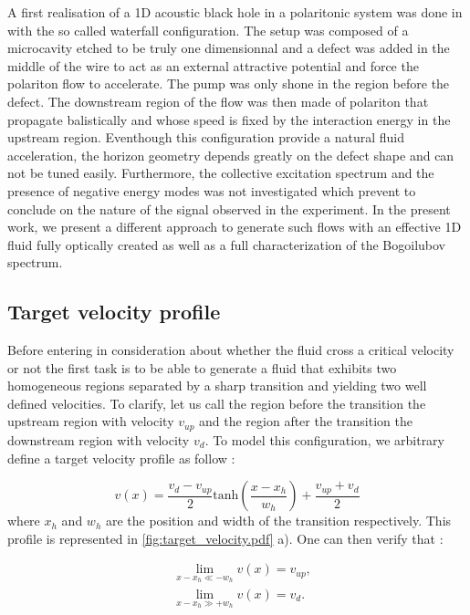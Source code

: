 A first realisation of a 1D acoustic black hole in a polaritonic system was done in \cite{nguyen_acoustic_2015} with the so called waterfall configuration. 
The setup was composed of a microcavity etched to be truly one dimensionnal and a defect was added in the middle of the wire to act as an external attractive potential and force the polariton flow to accelerate. The pump was only shone in the region before the defect. The downstream region of the flow was then made of polariton that propagate balistically and whose speed is fixed by the interaction energy
in the upstream region.
Eventhough this configuration provide a natural fluid acceleration, the horizon geometry depends greatly on the defect shape and can not be tuned easily.  Furthermore, the collective excitation spectrum and the presence of negative energy modes was not investigated which 
prevent to conclude on the nature of the signal observed in the experiment. In the present work, we present a different approach to generate such flows with an effective 1D fluid fully optically created as well as a full characterization of the Bogoilubov spectrum.

\subsection{Target velocity profile}
Before entering in consideration about whether the fluid cross a critical velocity or not the first task is to be able to generate a fluid that exhibits two homogeneous regions separated by a sharp transition and yielding two well defined velocities. 
To clarify, let us call the region before the transition the upstream region with velocity $v_{up}$ and the region after the transition the downstream region with velocity $v_d$.
To model this configuration, we arbitrary define a target velocity profile as follow : 

\begin{equation}
    v(x)= \frac{v_{d}-v_{up}}{2}\mathrm{tanh}(\frac{x-x_h}{w_h})+\frac{v_{up}+v_{d}}{2}
    \label{eq:target_velocity}
\end{equation}
where $x_h$ and $w_h$ are the position and width of the transition respectively. This profile is represented in \autoref{fig:target_velocity.pdf} a).
One can then verify that :

\begin{subequations}
    \begin{align}
    &\lim\limits_{x-x_h\ll-w_h} v(x) = v_{up},\\
    &\lim\limits_{x-x_h\gg+w_h} v(x) = v_{d}.
    \end{align}
\end{subequations}

